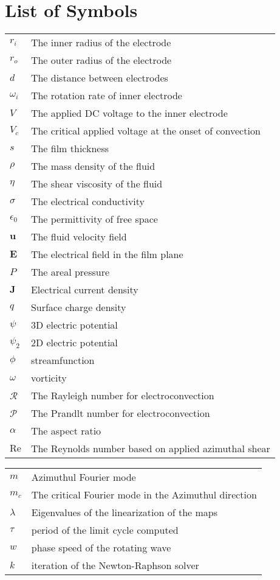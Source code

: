 \chapter*{List of Symbols}
\begin{tabular}{ll}
$r_i$           & The inner radius of the electrode \\
$r_o$           & The outer radius of the electrode \\
$d$             & The distance between electrodes \\
$\omega_i$      & The rotation rate of inner electrode\\
$V$             & The applied DC voltage to the inner electrode\\
$V_c$           & The critical applied voltage at the onset of convection\\
$s$             & The film thickness\\
$\rho$          & The mass density of the fluid\\
$\eta$          & The shear viscosity of the fluid\\
$\sigma$        & The electrical conductivity\\
$\epsilon_0$    & The permittivity of free space\\
$\mathbf{u}$    & The fluid velocity field\\
$\mathbf{E}$    & The electrical field in the film plane\\
$P$             & The areal pressure\\
$\mathbf{J}$    & Electrical current density\\
$q$             & Surface charge density\\
$\psi$          & 3D electric potential\\
$\psi_2$        & 2D electric potential\\
$\phi$          & streamfunction \\
$\omega$        & vorticity\\
$\mathcal{R}$   & The Rayleigh number for electroconvection\\
$\mathcal{P}$   & The Prandlt number for electroconvection\\
$\alpha$        & The aspect ratio\\
$\mathrm{Re}$   & The Reynolds number based on applied azimuthal shear\\
\end{tabular}
\newpage
\begin{tabular}{ll}
$m$             & Azimuthul Fourier mode\\
$m_c$           & The critical Fourier mode in the Azimuthul direction\\
$\lambda$       & Eigenvalues of the linearization of the maps\\
$\tau$          & period of the limit cycle computed\\
$w$             & phase speed of the rotating wave\\
$k$             & iteration of the Newton-Raphson solver\\
\end{tabular} 